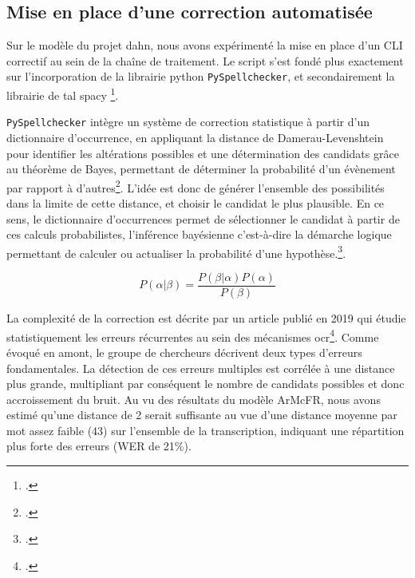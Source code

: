 	\subsection{Mise en place d'une correction automatisée}
	
	Sur le modèle du projet \gls{dahn}, nous avons expérimenté la mise en place d'un CLI correctif au sein de la chaîne de traitement. Le script s'est fondé plus exactement sur l'incorporation de la librairie python \texttt{PySpellchecker}, et secondairement la librairie de \gls{tal} \gls{spacy} \footcite{barrusPyspellchecker2022}.
	
	\texttt{PySpellchecker} intègre un système de correction statistique à partir d'un dictionnaire d'occurrence, en appliquant la distance de Damerau-Levenshtein pour identifier les altérations possibles et une détermination des candidats grâce au théorème de Bayes, permettant de déterminer la probabilité d'un évènement par rapport à d'autres\footcite{norvigHowWriteSpelling2007}. L'idée est donc de générer l'ensemble des possibilités dans la limite de cette distance, et choisir le candidat le plus plausible. En ce sens, le dictionnaire d'occurrences permet de sélectionner le candidat à partir de ces calculs probabilistes, l'inférence bayésienne c'est-à-dire la démarche logique permettant de calculer ou actualiser la probabilité d'une hypothèse.\footcite[Récemment cette technique est encore recommandée, avec une amélioration de près de 30\% des cas comme le révèle cette étude.][]{haldarLevenshteinDistanceTechnique}.
	
	\begin{equation}
    \label{eq:bayes}
    P(\alpha|\beta) = \frac{P(\beta |\alpha)P(\alpha)}{P(\beta)}
    \end{equation}
    
    La complexité de la correction est décrite par un article publié en 2019 qui étudie statistiquement les erreurs récurrentes au sein des mécanismes \gls{ocr}\footcite{nguyenDeepStatisticalAnalysis2019}. Comme évoqué en amont, le groupe de chercheurs décrivent deux types d'erreurs fondamentales. La détection de ces erreurs multiples est corrélée à une distance plus grande, multipliant par conséquent le nombre de candidats possibles et donc accroissement du bruit. Au vu des résultats du modèle ArMcFR, nous avons estimé qu'une distance de 2 serait suffisante au vue d'une distance moyenne par mot assez faible (43) sur l'ensemble de la transcription, indiquant une répartition plus forte des erreurs (WER de 21\%). \newpar
    
